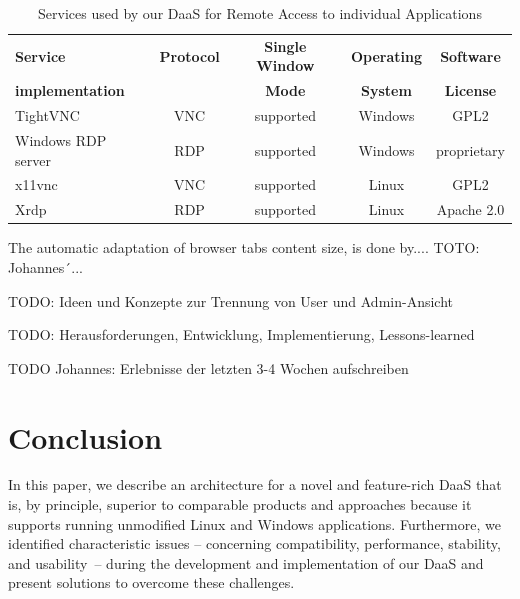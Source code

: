 \documentclass[runningheads]{llncs}
\begin{document}
\begin{table}
	\centering
	\caption{Services used by our DaaS for Remote Access to individual Applications}
	\begin{tabular}{|l|c|c|c|c|}
		\hline
		\textbf{Service}        & \textbf{Protocol} & \textbf{Single Window} & \textbf{Operating} & \textbf{Software} \\
		\textbf{implementation} &                   & \textbf{Mode}          & \textbf{System}    & \textbf{License}  \\
		\hline
		TightVNC                & VNC               & supported              & Windows            & GPL2              \\
		\hline
		Windows RDP server      & RDP               & supported              & Windows            & proprietary       \\
		\hline
		x11vnc                  & VNC               & supported              & Linux              & GPL2              \\
		\hline
		Xrdp                    & RDP               & supported              & Linux              & Apache 2.0        \\
		\hline
	\end{tabular}
	\label{tab:DaaS_Services_Overview}
\end{table}

The automatic adaptation of browser tabs content size, is done by.... TOTO: Johannes´...

TODO: Ideen und Konzepte zur Trennung von User und Admin-Ansicht

TODO: Herausforderungen, Entwicklung, Implementierung, Lessons-learned

TODO Johannes: Erlebnisse der letzten 3-4 Wochen aufschreiben



\section{Conclusion}
\label{sec:Conclusions}

In this paper, we describe an architecture for a novel and feature-rich DaaS that is, by principle, superior to comparable products and approaches because it supports running unmodified Linux and Windows applications. Furthermore, we identified characteristic issues -- concerning compatibility, performance, stability, and usability -- during the development and implementation of our DaaS and present solutions to overcome these challenges.
\end{document}
